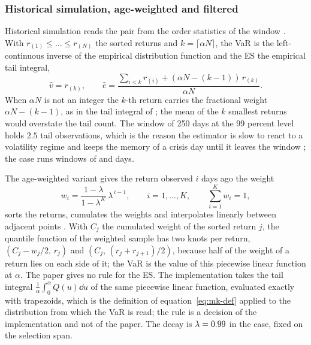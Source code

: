\subsubsection{Historical simulation, age-weighted and filtered}
Historical simulation reads the pair from the order statistics of the window \citep{market:pritsker2001}. With $r_{(1)}\le\dots\le r_{(N)}$
the sorted returns and $k=\lceil\alpha N\rceil$, the VaR is the left-continuous inverse of the empirical distribution function and the
ES the empirical tail integral,
\begin{equation}
\widehat v=r_{(k)},\qquad \widehat e=\frac{\sum_{i<k}r_{(i)}+(\alpha N-(k-1))\,r_{(k)}}{\alpha N}.
\label{eq:mk-sample}
\end{equation}
When $\alpha N$ is not an integer the $k$-th return carries the fractional weight $\alpha N-(k-1)$, as in the tail integral of
\citet{credit-capital:acerbitasche2002}; the mean of the $k$ smallest returns would overstate the tail count. The window of 250 days at the 99
percent level holds $2.5$ tail observations, which is the reason the estimator is slow to react to a volatility regime and keeps the
memory of a crisis day until it leaves the window \citep{market:pritsker2001}; the case runs windows of \mkHsShort{} and \mkHsLong{} days.

The age-weighted variant gives the return observed $i$ days ago the weight
\begin{equation}
w_i=\frac{1-\lambda}{1-\lambda^{K}}\,\lambda^{\,i-1},\qquad i=1,\dots,K,\qquad\sum_{i=1}^{K}w_i=1,
\label{eq:mk-awhs}
\end{equation}
sorts the returns, cumulates the weights and interpolates linearly between adjacent points \citep{market:boudoukh1998}. With $C_j$ the
cumulated weight of the sorted return $j$, the quantile function of the weighted sample has two knots per return,
$(C_j-w_j/2,\,r_j)$ and $(C_j,\,(r_j+r_{j+1})/2)$, because half of the weight of a return lies on each side of it; the VaR is the
value of this piecewise linear function at $\alpha$. The paper gives no rule for the ES. The implementation takes the tail integral
$\frac1\alpha\int_0^\alpha Q(u)\dd u$ of the same piecewise linear function, evaluated exactly with trapezoids, which is the
definition of equation~\eqref{eq:mk-def} applied to the distribution from which the VaR is read; the rule is a decision of the
implementation and not of the paper. The decay is $\lambda=0.99{}$ in the case, fixed on the selection span.

